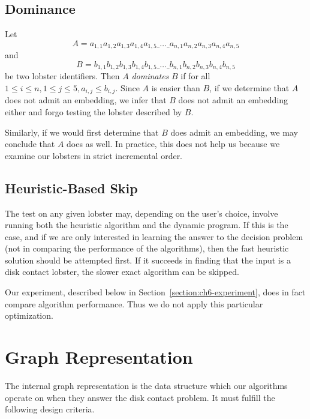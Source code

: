 \subsection{Dominance}

Let $$A = a_{1,1}a_{1,2}a_{1,3}a_{1,4}a_{1,5}\_\ldots\_a_{n,1}a_{n,2}a_{n,3}a_{n,4}a_{n,5}$$ and $$B = b_{1,1}b_{1,2}b_{1,3}b_{1,4}b_{1,5}\_\ldots\_b_{n,1}b_{n,2}b_{n,3}b_{n,4}b_{n,5}$$ be two lobster identifiers. Then $A$ \emph{dominates} $B$ if for all $1 \leq i \leq n, 1 \leq j \leq 5, a_{i,j} \leq b_{i,j}$. Since $A$ is easier than $B$, if we determine that $A$ does not admit an embedding, we infer that $B$ does not admit an embedding either and forgo testing the lobster described by $B$.

Similarly, if we would first determine that $B$ does admit an embedding, we may conclude that $A$ does as well. In practice, this does not help us because we examine our lobsters in strict incremental order.

\subsection{Heuristic-Based Skip}

The test on any given lobster may, depending on the user's choice, involve running both the heuristic algorithm and the dynamic program. If this is the case, and if we are only interested in learning the answer to the decision problem (not in comparing the performance of the algorithms), then the fast heuristic solution should be attempted first. If it succeeds in finding that the input is a disk contact lobster, the slower exact algorithm can be skipped.

Our experiment, described below in Section~\ref{section:ch6-experiment}, does in fact compare algorithm performance. Thus we do not apply this particular optimization.

\section{Graph Representation}

The internal graph representation is the data structure which our algorithms operate on when they answer the disk contact problem. It must fulfill the following design criteria.

